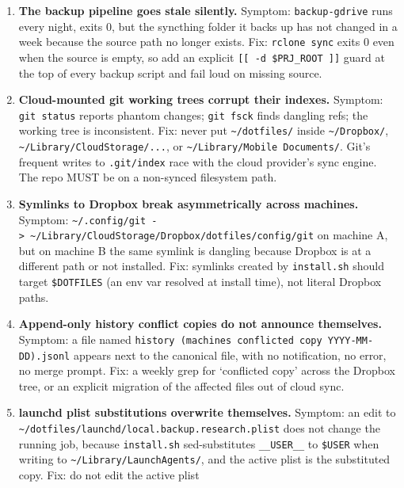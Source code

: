 \documentclass[
  11pt,
  letterpaper,
  DIV=11,
  numbers=noendperiod]{scrartcl}
\providecommand{\tightlist}{%
  \setlength{\itemsep}{0pt}\setlength{\parskip}{0pt}}\usepackage{longtable,booktabs,array}
\begin{document}
\begin{enumerate}
\def\labelenumi{\arabic{enumi}.}
\tightlist
\item
  \textbf{The backup pipeline goes stale silently.} Symptom:
  \texttt{backup-gdrive} runs every night, exits 0, but the syncthing
  folder it backs up has not changed in a week because the source path
  no longer exists. Fix: \texttt{rclone\ sync} exits 0 even when the
  source is empty, so add an explicit
  \texttt{{[}{[}\ -d\ \$PRJ\_ROOT\ {]}{]}} guard at the top of every
  backup script and fail loud on missing source.
\item
  \textbf{Cloud-mounted git working trees corrupt their indexes.}
  Symptom: \texttt{git\ status} reports phantom changes;
  \texttt{git\ fsck} finds dangling refs; the working tree is
  inconsistent. Fix: never put \texttt{\textasciitilde{}/dotfiles/}
  inside \texttt{\textasciitilde{}/Dropbox/},
  \texttt{\textasciitilde{}/Library/CloudStorage/...}, or
  \texttt{\textasciitilde{}/Library/Mobile\ Documents/}. Git's frequent
  writes to \texttt{.git/index} race with the cloud provider's sync
  engine. The repo MUST be on a non-synced filesystem path.
\item
  \textbf{Symlinks to Dropbox break asymmetrically across machines.}
  Symptom:
  \texttt{\textasciitilde{}/.config/git\ -\textgreater{}\ \textasciitilde{}/Library/CloudStorage/Dropbox/dotfiles/config/git}
  on machine A, but on machine B the same symlink is dangling because
  Dropbox is at a different path or not installed. Fix: symlinks created
  by \texttt{install.sh} should target \texttt{\$DOTFILES} (an env var
  resolved at install time), not literal Dropbox paths.
\item
  \textbf{Append-only history conflict copies do not announce
  themselves.} Symptom: a file named
  \texttt{history\ (machine\textquotesingle{}s\ conflicted\ copy\ YYYY-MM-DD).jsonl}
  appears next to the canonical file, with no notification, no error, no
  merge prompt. Fix: a weekly grep for `conflicted copy' across the
  Dropbox tree, or an explicit migration of the affected files out of
  cloud sync.
\item
  \textbf{launchd plist substitutions overwrite themselves.} Symptom: an
  edit to
  \texttt{\textasciitilde{}/dotfiles/launchd/local.backup.research.plist}
  does not change the running job, because \texttt{install.sh}
  sed-substitutes \texttt{\_\_USER\_\_} to \texttt{\$USER} when writing
  to \texttt{\textasciitilde{}/Library/LaunchAgents/}, and the active
  plist is the substituted copy. Fix: do not edit the active plist

\end{enumerate}
\end{document}
